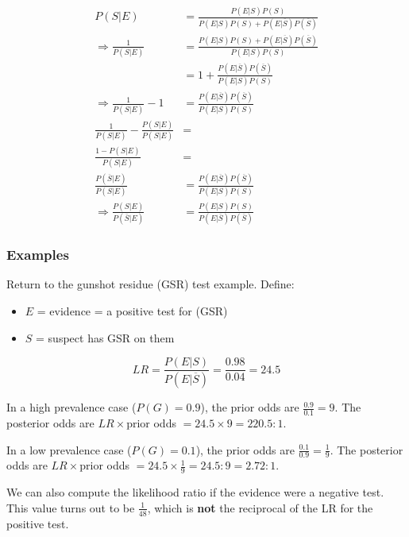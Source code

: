 \documentclass[]{book}
\providecommand{\tightlist}{%
  \setlength{\itemsep}{0pt}\setlength{\parskip}{0pt}}
\theoremstyle{definition}
\theoremstyle{definition}
\theoremstyle{remark}
\begin{document}
\begin{equation}\label{eq:7}
\begin{split}
P(S|E) & = \frac{P(E|S)P(S)}{P(E|S)P(S) + P(E|\overline{S})P(\overline{S})} \\
\Rightarrow \frac{1}{P(S|E)} & = \frac{P(E|S)P(S) + P(E|\overline{S})P(\overline{S})}{P(E|S)P(S)} \\ 
  & = 1 + \frac{P(E|\overline{S})P(\overline{S})}{P(E|S)P(S)} \\ 
\Rightarrow \frac{1}{P(S|E)} -1 & = \frac{P(E|\overline{S})P(\overline{S})}{P(E|S)P(S)} \\ 
\frac{1}{P(S|E)} - \frac{P(S|E)}{P(S|E)} & = \\
\frac{1-P(S|E)}{P(S|E)} & = \\
\frac{P(\overline{S}|E)}{P(S|E)} & =  \frac{P(E|\overline{S})P(\overline{S})}{P(E|S)P(S)} \\
\Rightarrow \frac{P(S|E)}{P(\overline{S}|E)} & = \frac{P(E|S)P(S)}{P(E|\overline{S})P(\overline{S})} 
\end{split}
\end{equation}

\subsubsection{Examples}\label{examples-3}

Return to the gunshot residue (GSR) test example. Define:

\begin{itemize}
\tightlist
\item
  \(E\) = evidence = a positive test for (GSR)
\item
  \(S\) = suspect has GSR on them
\end{itemize}

\[LR = \frac{P(E|S)}{P(E|\overline{S})} = \frac{0.98}{0.04} = 24.5\]

In a high prevalence case (\(P(G)=0.9\)), the prior odds are
\(\frac{0.9}{0.1} = 9\). The posterior odds are \(LR \times\)prior odds
\(= 24.5\times 9 = 220.5:1\).

In a low prevalence case (\(P(G)=0.1\)), the prior odds are
\(\frac{0.1}{0.9} = \frac{1}{9}\). The posterior odds are
\(LR \times\)prior odds \(= 24.5\times \frac{1}{9} = 24.5:9 = 2.72:1\).

We can also compute the likelihood ratio if the evidence were a negative
test. This value turns out to be \(\frac{1}{48}\), which is \textbf{not}
the reciprocal of the LR for the positive test.
\end{document}
